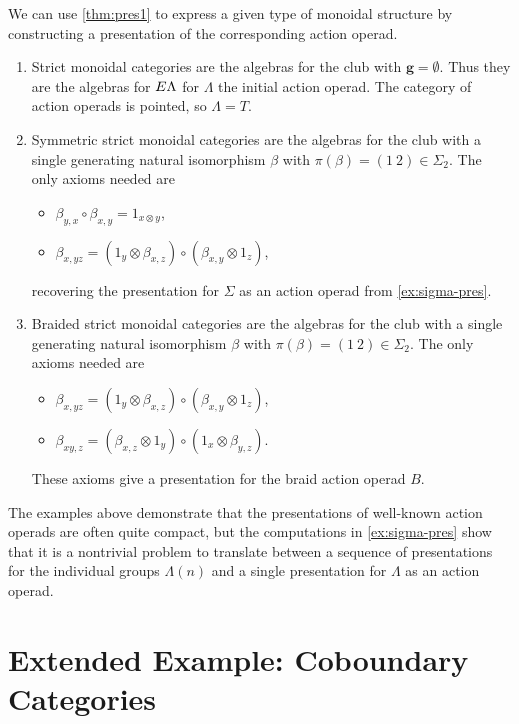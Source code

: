 \begin{example}\label{ex:S-moncats}
We can use \cref{thm:pres1} to express a given type of monoidal structure by constructing a presentation of the corresponding action operad.
\begin{enumerate}
\item Strict monoidal categories are the algebras for the club with $\mathbf{g} = \emptyset$. Thus they are the algebras for $E\Lambda$ for $\Lambda$ the initial action operad. The category of action operads is pointed, so $\Lambda = T$.
\item Symmetric strict monoidal categories are the algebras for the club with a single generating natural isomorphism $\beta$ with $\pi(\beta) = (1 \ 2) \in \Sigma_2$. The only axioms needed are
\begin{itemize}
\item $\beta_{y,x} \circ \beta_{x,y} = 1_{x \otimes y}$,
\item $\beta_{x,yz} = (1_y \otimes \beta_{x,z}) \circ (\beta_{x,y} \otimes 1_z)$,
\end{itemize}
recovering the presentation for $\Sigma$ as an action operad from \cref{ex:sigma-pres}.
\item Braided strict monoidal categories are the algebras for the club with a single generating natural isomorphism $\beta$ with $\pi(\beta) = (1 \ 2) \in \Sigma_2$. The only axioms needed are
\begin{itemize}
\item $\beta_{x,yz} = (1_y \otimes \beta_{x,z}) \circ (\beta_{x,y} \otimes 1_z)$,
\item $\beta_{xy,z} = (\beta_{x,z} \otimes 1_y) \circ (1_{x} \otimes \beta_{y,z})$.
\end{itemize}
These axioms give a presentation for the braid action operad $B$.
\end{enumerate}
\end{example}

\begin{rem}\label{rem:two-presentations}
The examples above demonstrate that the presentations of well-known action operads are often quite compact, but the computations in \cref{ex:sigma-pres} show that it is a nontrivial problem to translate between a sequence of presentations for the individual groups $\Lambda(n)$ and a single presentation for $\Lambda$ as an action operad.
\end{rem}

\section{Extended Example: Coboundary Categories}\label{sec:exex-cactus}

